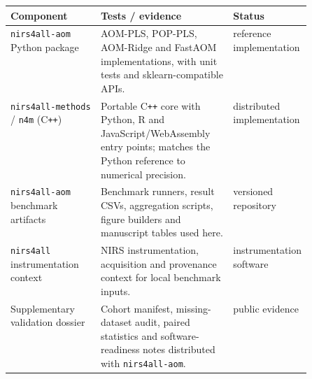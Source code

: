 \begin{tabularx}{\linewidth}{p{0.30\linewidth} X p{0.20\linewidth}}
\toprule
Component & Tests / evidence & Status \\
\midrule
\texttt{nirs4all-aom} Python package & AOM-PLS, POP-PLS, AOM-Ridge and FastAOM implementations, with unit tests and sklearn-compatible APIs. & reference implementation \\
\texttt{nirs4all-methods} / \texttt{n4m} (C\texttt{++}) & Portable C\texttt{++} core with Python, R and JavaScript/WebAssembly entry points; matches the Python reference to numerical precision. & distributed implementation \\
\texttt{nirs4all-aom} benchmark artifacts & Benchmark runners, result CSVs, aggregation scripts, figure builders and manuscript tables used here. & versioned repository \\
\texttt{nirs4all} instrumentation context & NIRS instrumentation, acquisition and provenance context for local benchmark inputs. & instrumentation software \\
Supplementary validation dossier & Cohort manifest, missing-dataset audit, paired statistics and software-readiness notes distributed with \texttt{nirs4all-aom}. & public evidence \\
\bottomrule
\end{tabularx}
